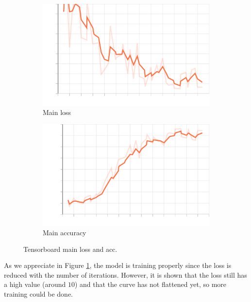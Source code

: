 \documentclass[a4paper]{article}
\begin{document}
\begin{itemize}
        \begin{figure}[H]
          \centering
          \begin{subfigure}[b]{0.45\textwidth}
            \centering
            \includegraphics[width=\textwidth]{Figures/main_loss.pdf}
            \caption{Main loss}
            \label{fig:main:loss}
          \end{subfigure}
          \hfill
          \begin{subfigure}[b]{0.45\textwidth}
            \centering
            \includegraphics[width=\textwidth]{Figures/main_acc.pdf}
            \caption{Main accuracy}
            \label{fig:main:acc}
          \end{subfigure}
          \caption{Tensorboard main loss and acc.}
          \label{fig:main}
        \end{figure}

        As we appreciate in Figure \ref{fig:main:loss}, the model is training properly since the loss is reduced with the number of iterations. However, it is shown that the loss still has a high value (around \(10\)) and that the curve has not flattened yet, so more training could be done.\\


\end{itemize}
\end{document}
